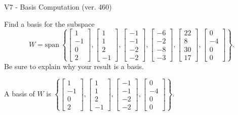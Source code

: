 \begin{exercise}
  \begin{exerciseTitle}V7 - Basis Computation (ver. 460)\end{exerciseTitle}
  \begin{exerciseStatement}
    Find a basis for the subspace 
\[W=\mathrm{span}\ \left\{\left[\begin{array}{r}
1 \\
-1 \\
0 \\
2
\end{array}\right] , \left[\begin{array}{r}
1 \\
1 \\
2 \\
-1
\end{array}\right] , \left[\begin{array}{r}
-1 \\
-1 \\
-2 \\
-2
\end{array}\right] , \left[\begin{array}{r}
-6 \\
-2 \\
-8 \\
-3
\end{array}\right] , \left[\begin{array}{r}
22 \\
8 \\
30 \\
17
\end{array}\right] , \left[\begin{array}{r}
0 \\
-4 \\
0 \\
0
\end{array}\right]\right\}.\]
 Be sure to explain why your result is a basis.


  \end{exerciseStatement}
  \begin{exerciseAnswer}
   A basis of \(W\) is  \(\left\{\left[\begin{array}{r}
1 \\
-1 \\
0 \\
2
\end{array}\right] , \left[\begin{array}{r}
1 \\
1 \\
2 \\
-1
\end{array}\right] , \left[\begin{array}{r}
-1 \\
-1 \\
-2 \\
-2
\end{array}\right] , \left[\begin{array}{r}
0 \\
-4 \\
0 \\
0
\end{array}\right]\right\}\).
  


  \end{exerciseAnswer}
\end{exercise}